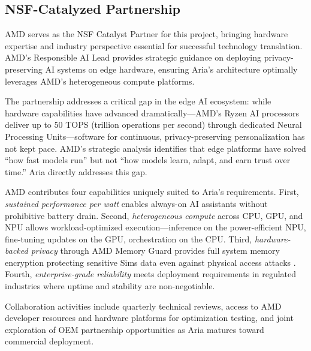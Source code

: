\documentclass[11pt]{article}
\begin{document}

\vspace*{-10pt}
\subsection{NSF-Catalyzed Partnership}
\vspace*{-8pt}
AMD serves as the NSF Catalyst Partner for this project, bringing hardware 
expertise and industry perspective essential for successful technology 
translation. AMD's Responsible AI Lead provides strategic guidance on 
deploying privacy-preserving AI systems on edge hardware, ensuring Aria's 
architecture optimally leverages AMD's heterogeneous compute platforms.

The partnership addresses a critical gap in the edge AI ecosystem: while 
hardware capabilities have advanced dramatically---AMD's Ryzen AI processors 
deliver up to 50 TOPS (trillion operations per second) through dedicated 
Neural Processing Units---software for continuous, privacy-preserving 
personalization has not kept pace. AMD's strategic analysis identifies that 
edge platforms have solved ``how fast models run'' but not ``how models 
learn, adapt, and earn trust over time.'' Aria directly addresses this gap.

AMD contributes four capabilities uniquely suited to Aria's requirements. 
First, \textit{sustained performance per watt} enables always-on AI assistants 
without prohibitive battery drain. Second, \textit{heterogeneous compute} 
across CPU, GPU, and NPU allows workload-optimized execution---inference on 
the power-efficient NPU, fine-tuning updates on the GPU, orchestration on 
the CPU. Third, \textit{hardware-backed privacy} through AMD Memory Guard 
provides full system memory encryption protecting sensitive Sims data even 
against physical access attacks \cite{amd2024prosecurity}. Fourth, 
\textit{enterprise-grade reliability} meets deployment requirements in 
regulated industries where uptime and stability are non-negotiable.

Collaboration activities include quarterly technical reviews, access to AMD 
developer resources and hardware platforms for optimization testing, and 
joint exploration of OEM partnership opportunities as Aria matures toward 
commercial deployment.
\end{document}
